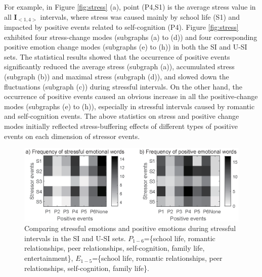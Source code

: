 For example, in Figure \ref{fig:stress} (a),
point (P4,S1) is the average stress value in all $\textbf{I}_{<1,4>}$ intervals,
where stress was caused mainly by school life (S1) and impacted by positive events related to self-cognition (P4).
Figure \ref{fig:stress} exhibited four stress-change modes (subgraphs (a) to (d))
and four corresponding positive emotion change modes (subgraphs (e) to (h)) in both the SI and U-SI sets.
The statistical results showed that the occurrence of positive events significantly
reduced the average stress (subgraph (a)), accumulated stress (subgraph (b)) and maximal stress (subgraph (d)),
and slowed down the fluctuations (subgraph (c)) during stressful intervals.
On the other hand,
the occurrence of positive events caused an obvious increase in all the positive-change modes
(subgraphs (e) to (h)), especially in stressful intervals caused by romantic and self-cognition events.
The above statistics on stress and positive change modes
initially reflected stress-buffering effects of different types of positive events on each dimension of stressor events.

\begin{figure}[h]
\centering
\includegraphics[width=\linewidth]{figs/gray/emotion.eps}
\caption{\small{Comparing stressful emotions and positive emotions during stressful intervals in the SI and U-SI sets.
$P_{1-6}$=\{school life, romantic relationships, peer relationships, self-cognition, family life, entertainment\},
$E_{1-5}$=\{school life, romantic relationships, peer relationships, self-cognition, family life\}.
}}
\label{fig:topicAll}
\end{figure}

